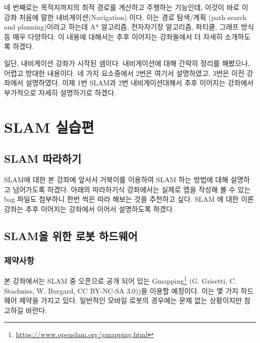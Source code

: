 네 번째로는 목적지까지의 최적 경로를 계산하고 주행하는 기능인데, 이것이 바로 이 강좌 처음에 말한 내비게이션(Navigation) 이다. 이는 경로 탐색/계획  (path search and planning)이라고 하는데 A* 알고리즘, 전자자기장 알고리즘, 파티클, 그래프 방식 등 매우 다양하다. 이 내용에 대해서는 추후 이어지는 강좌들에서 더 자세히 소개하도록 하겠다.

일단, 내비게이션 강좌가 시작된 샘이다. 내비게이션에 대해 간략히 정리를 해봤으나, 어렵고 방대한 내용이다. 네 가지 요소중에서 2번은 여기서 설명하였고, 3번은 이전 강좌에서 설명하였다. 이제 1번 SLAM과 2번 내비게이션대해서 추후 이어지는 강좌에서 부가적으로 자세히 설명하기로 하겠다.

\section{SLAM 실습편}

\subsection{SLAM 따라하기}

SLAM에 대한 본 강좌에 앞서서 거북이를 이용하여 SLAM 하는 방법에 대해 설명하고 넘어가도록 하겠다. 아래의 따라하기식 강좌에서는 실제로 맵을 작성해 볼 수 있는 bag 파일도 첨부하니 한번 씩은 따라 해보는 것을 추천하고 싶다. SLAM 에 대한 이론 강좌는 추후 이어지는 강좌에서 이어서 설명하도록 하겠다.

\subsection{SLAM을 위한 로봇 하드웨어}

\subsubsection{제약사항}

본 강좌에서는 SLAM 중 오픈으로 공개 되어 있는 Gmapping\footnote{\url{https://www.openslam.org/gmapping.html}} (G. Grisetti, C. Stachniss, W, Burgard, CC BY-NC-SA 3.0))을 이용할 예정이다. 이는 몇 가지 하드웨어 제약을 가지고 있다. 일반적인 모바일 로봇의 경우에는 문제 없는 상황이지만 참고하길 바란다.

